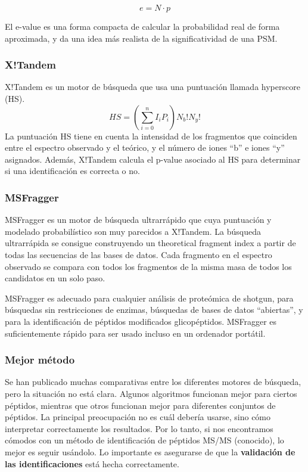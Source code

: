 $$e = N \cdot p$$

El e-value es una forma compacta de calcular la probabilidad real de forma aproximada, y da una idea más realista de la significatividad de una PSM.

\subsubsection{X!Tandem}
X!Tandem es un motor de búsqueda que usa una puntuación llamada hyperscore (HS).
$$HS = (\sum^n_{i = 0} I_i P_i) N_b!N_y!$$
La puntuación HS tiene en cuenta la intensidad de los fragmentos que coinciden entre el espectro observado y el teórico, y el número de iones “b” e iones “y” asignados. Además, X!Tandem calcula el p-value asociado al HS para determinar si una identificación es correcta o no.

\subsubsection{MSFragger}
MSFragger es un motor de búsqueda ultrarrápido que cuya puntuación y modelado probabilístico son muy parecidos a X!Tandem. La búsqueda ultrarrápida se consigue construyendo un theoretical fragment index a partir de todas las secuencias de las bases de datos. Cada fragmento en el espectro observado se compara con todos los fragmentos de la misma masa de todos los candidatos en un solo paso.

MSFragger es adecuado para cualquier análisis de proteómica de shotgun, para búsquedas sin restricciones de enzimas, búsquedas de bases de datos “abiertas”, y para la identificación de péptidos modificados glicopéptidos. MSFragger es suficientemente rápido para ser usado incluso en un ordenador portátil.

\subsubsection{Mejor método}
Se han publicado muchas comparativas entre los diferentes motores de búsqueda, pero la situación no está clara. Algunos algoritmos funcionan mejor para ciertos péptidos, mientras que otros funcionan mejor para diferentes conjuntos de péptidos. La principal preocupación no es cuál debería usarse, sino cómo interpretar correctamente los resultados. Por lo tanto, si nos encontramos cómodos con un método de identificación de péptidos MS/MS (conocido), lo mejor es seguir usándolo. Lo importante es asegurarse de que la \textbf{validación de las identificaciones} está hecha correctamente. 

